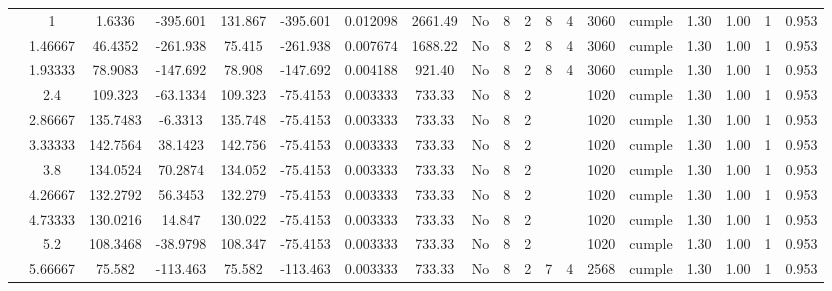 \begin{table}[H]
{\begin{tabular}{|c|c|c|c|c|c|r|c|c|c|c|c|c|c|c|c|c|c|c|}
\cline{2-19}        & \cellcolor[rgb]{ .851,  .882,  .949}1 & 1.6336 & -395.601 & 131.867 & -395.601 & 0.012098 & 2661.49 & No  & 8   & 2   & 8   & 4   & 3060 & \cellcolor[rgb]{ .776,  .937,  .808}cumple & 1.30 & 1.00 & 1   & 0.953 \bigstrut\\
\cline{2-19}        & 1.46667 & 46.4352 & -261.938 & 75.415 & -261.938 & 0.007674 & 1688.22 & No  & 8   & 2   & 8   & 4   & 3060 & \cellcolor[rgb]{ .776,  .937,  .808}cumple & 1.30 & 1.00 & 1   & 0.953 \bigstrut\\
\cline{2-19}        & 1.93333 & 78.9083 & -147.692 & 78.908 & -147.692 & 0.004188 & 921.40 & No  & 8   & 2   & 8   & 4   & 3060 & \cellcolor[rgb]{ .776,  .937,  .808}cumple & 1.30 & 1.00 & 1   & 0.953 \bigstrut\\
\cline{2-19}        & 2.4 & 109.323 & -63.1334 & 109.323 & -75.4153 & 0.003333 & 733.33 & No  & 8   & 2   &     &     & 1020 & \cellcolor[rgb]{ .776,  .937,  .808}cumple & 1.30 & 1.00 & 1   & 0.953 \bigstrut\\
\cline{2-19}        & 2.86667 & 135.7483 & -6.3313 & 135.748 & -75.4153 & 0.003333 & 733.33 & No  & 8   & 2   &     &     & 1020 & \cellcolor[rgb]{ .776,  .937,  .808}cumple & 1.30 & 1.00 & 1   & 0.953 \bigstrut\\
\cline{2-19}        & 3.33333 & 142.7564 & 38.1423 & 142.756 & -75.4153 & 0.003333 & 733.33 & No  & 8   & 2   &     &     & 1020 & \cellcolor[rgb]{ .776,  .937,  .808}cumple & 1.30 & 1.00 & 1   & 0.953 \bigstrut\\
\cline{2-19}        & 3.8 & 134.0524 & 70.2874 & 134.052 & -75.4153 & 0.003333 & 733.33 & No  & 8   & 2   &     &     & 1020 & \cellcolor[rgb]{ .776,  .937,  .808}cumple & 1.30 & 1.00 & 1   & 0.953 \bigstrut\\
\cline{2-19}        & 4.26667 & 132.2792 & 56.3453 & 132.279 & -75.4153 & 0.003333 & 733.33 & No  & 8   & 2   &     &     & 1020 & \cellcolor[rgb]{ .776,  .937,  .808}cumple & 1.30 & 1.00 & 1   & 0.953 \bigstrut\\
\cline{2-19}        & 4.73333 & 130.0216 & 14.847 & 130.022 & -75.4153 & 0.003333 & 733.33 & No  & 8   & 2   &     &     & 1020 & \cellcolor[rgb]{ .776,  .937,  .808}cumple & 1.30 & 1.00 & 1   & 0.953 \bigstrut\\
\cline{2-19}        & 5.2 & 108.3468 & -38.9798 & 108.347 & -75.4153 & 0.003333 & 733.33 & No  & 8   & 2   &     &     & 1020 & \cellcolor[rgb]{ .776,  .937,  .808}cumple & 1.30 & 1.00 & 1   & 0.953 \bigstrut\\
\cline{2-19}        & 5.66667 & 75.582 & -113.463 & 75.582 & -113.463 & 0.003333 & 733.33 & No  & 8   & 2   & 7   & 4   & 2568 & \cellcolor[rgb]{ .776,  .937,  .808}cumple & 1.30 & 1.00 & 1   & 0.953 \bigstrut\\

\end{tabular}}
\end{table}
